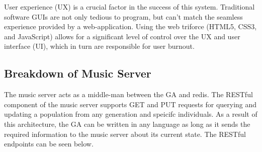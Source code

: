 \documentclass[12pt]{article} %
\begin{document}
User experience (UX) is a crucial factor in the success of this system. Traditional software GUIs are not only tedious to program, but can’t match the seamless experience provided by a web-application. Using the web triforce (HTML5, CSS3, and JavaScript) allows for a significant level of control over the UX and user interface (UI), which in turn are responsible for user burnout.

\subsection{Breakdown of Music Server}
The music server acts as a middle-man between the GA and redis. The RESTful component of the music server supports GET and PUT requests for querying and updating a population from any generation and speicifc individuals. As a result of this architecture, the GA can be written in any language as long as it sends the required information to the music server about its current state. The RESTful endpoints can be seen below. 
\end{document}
